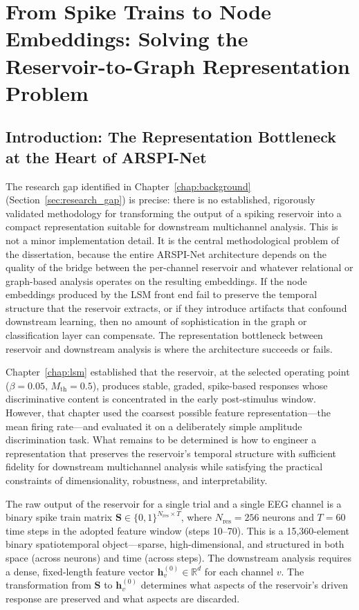 \chapter{From Spike Trains to Node Embeddings: Solving the Reservoir-to-Graph Representation Problem}
\label{chap:embeddings}

\section{Introduction: The Representation Bottleneck at the Heart of ARSPI-Net}
\label{sec:ch4_intro}

The research gap identified in Chapter~\ref{chap:background} (Section~\ref{sec:research_gap}) is precise: there is no established, rigorously validated methodology for transforming the output of a spiking reservoir into a compact representation suitable for downstream multichannel analysis. This is not a minor implementation detail. It is the central methodological problem of the dissertation, because the entire ARSPI-Net architecture depends on the quality of the bridge between the per-channel reservoir and whatever relational or graph-based analysis operates on the resulting embeddings. If the node embeddings produced by the LSM front end fail to preserve the temporal structure that the reservoir extracts, or if they introduce artifacts that confound downstream learning, then no amount of sophistication in the graph or classification layer can compensate. The representation bottleneck between reservoir and downstream analysis is where the architecture succeeds or fails.

Chapter~\ref{chap:lsm} established that the reservoir, at the selected operating point ($\beta = 0.05$, $M_{\text{th}} = 0.5$), produces stable, graded, spike-based responses whose discriminative content is concentrated in the early post-stimulus window. However, that chapter used the coarsest possible feature representation---the mean firing rate---and evaluated it on a deliberately simple amplitude discrimination task. What remains to be determined is how to engineer a representation that preserves the reservoir's temporal structure with sufficient fidelity for downstream multichannel analysis while satisfying the practical constraints of dimensionality, robustness, and interpretability.

The raw output of the reservoir for a single trial and a single EEG channel is a binary spike train matrix $\mathbf{S} \in \{0, 1\}^{N_{\text{res}} \times T}$, where $N_{\text{res}} = 256$ neurons and $T = 60$ time steps in the adopted feature window (steps 10--70). This is a 15,360-element binary spatiotemporal object---sparse, high-dimensional, and structured in both space (across neurons) and time (across steps). The downstream analysis requires a dense, fixed-length feature vector $\mathbf{h}_v^{(0)} \in \mathbb{R}^d$ for each channel $v$. The transformation from $\mathbf{S}$ to $\mathbf{h}_v^{(0)}$ determines what aspects of the reservoir's driven response are preserved and what aspects are discarded.


